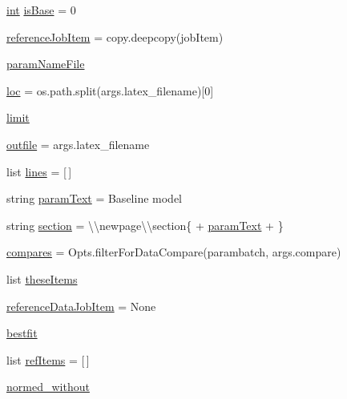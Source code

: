 \begin{DoxyCompactItemize}
\mbox{\hyperlink{namespacemakeTables_ae905fd0466745c7f0de3d5be4a4e028b}{int}} \mbox{\hyperlink{namespacemakeTables_aad31729af8c5c0c28c965a8880166c50}{is\+Base}} = 0
\item 
\mbox{\hyperlink{namespacemakeTables_a1cae4337555e5967aef37fdffadd4dc4}{reference\+Job\+Item}} = copy.\+deepcopy(job\+Item)
\item 
\mbox{\hyperlink{namespacemakeTables_a4770cc693c541fc80334bebc9be7b8d6}{param\+Name\+File}}
\item 
\mbox{\hyperlink{namespacemakeTables_af874d98b6771930df20a8a81cf455ace}{loc}} = os.\+path.\+split(args.\+latex\+\_\+filename)\mbox{[}0\mbox{]}
\item 
\mbox{\hyperlink{namespacemakeTables_a6b1920b359f514b3f7bfc090374ad85d}{limit}}
\item 
\mbox{\hyperlink{namespacemakeTables_a5b2a60e5426f013550a0491f01657fdb}{outfile}} = args.\+latex\+\_\+filename
\item 
list \mbox{\hyperlink{namespacemakeTables_ae0458d41b49c5abdeadb75f4cd0469c6}{lines}} = \mbox{[}$\,$\mbox{]}
\item 
string \mbox{\hyperlink{namespacemakeTables_acb89b46fcf39a44e9dc7ebe922f81f0e}{param\+Text}} = \textquotesingle{}Baseline model\textquotesingle{}
\item 
string \mbox{\hyperlink{namespacemakeTables_a7da11f1c70714c321f800cb70031c2ed}{section}} = \textquotesingle{}\textbackslash{}\textbackslash{}newpage\textbackslash{}\textbackslash{}section\{ \textquotesingle{} + \mbox{\hyperlink{namespacemakeTables_acb89b46fcf39a44e9dc7ebe922f81f0e}{param\+Text}} + \textquotesingle{}\}\textquotesingle{}
\item 
\mbox{\hyperlink{namespacemakeTables_a3aed201db91b67fb7636cb7b0a14712e}{compares}} = Opts.\+filter\+For\+Data\+Compare(parambatch, args.\+compare)
\item 
list \mbox{\hyperlink{namespacemakeTables_a86cc3672f98bbfb5411b7d0fc643f57d}{these\+Items}}
\item 
\mbox{\hyperlink{namespacemakeTables_ad2d53b08380c10346fc6ff9a0e12942b}{reference\+Data\+Job\+Item}} = None
\item 
\mbox{\hyperlink{namespacemakeTables_aa67f035fbf6ed03e40058b9fab156294}{bestfit}}
\item 
list \mbox{\hyperlink{namespacemakeTables_a9bdaaa58c735a7cb4ff48e801ab83303}{ref\+Items}} = \mbox{[}$\,$\mbox{]}
\item 
\mbox{\hyperlink{namespacemakeTables_ae11ee5b088843354e9b3bdd07f463dd3}{normed\+\_\+without}}

\end{DoxyCompactItemize}
